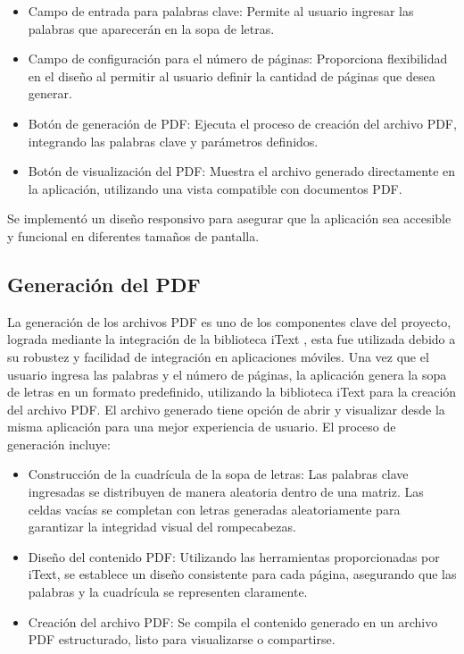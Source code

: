 \documentclass[conference]{IEEEtran}
\begin{document}
\begin{itemize}
    \item Campo de entrada para palabras clave: Permite al usuario ingresar las palabras que aparecerán en la sopa de letras.

    \item Campo de configuración para el número de páginas: Proporciona flexibilidad en el diseño al permitir al usuario definir la cantidad de páginas que desea generar.

    \item Botón de generación de PDF: Ejecuta el proceso de creación del archivo PDF, integrando las palabras clave y parámetros definidos.

    \item Botón de visualización del PDF: Muestra el archivo generado directamente en la aplicación, utilizando una vista compatible con documentos PDF.
\end{itemize}

Se implementó un diseño responsivo para asegurar que la aplicación sea accesible y funcional en diferentes tamaños de pantalla.

\subsection{Generación del PDF}
La generación de los archivos PDF es uno de los componentes clave del proyecto, lograda mediante la integración de la biblioteca iText \cite{itextpdf}, esta fue utilizada debido a su robustez y facilidad de integración en aplicaciones móviles. 
Una vez que el usuario ingresa las palabras y el número de páginas, la aplicación genera la sopa de letras en un formato predefinido, utilizando la biblioteca iText para la creación del archivo PDF. El archivo generado tiene opción de abrir y visualizar desde la misma aplicación para una mejor experiencia de usuario.
El proceso de generación incluye:
\begin{itemize}
    \item Construcción de la cuadrícula de la sopa de letras: Las palabras clave ingresadas se distribuyen de manera aleatoria dentro de una matriz. Las celdas vacías se completan con letras generadas aleatoriamente para garantizar la integridad visual del rompecabezas.

    \item Diseño del contenido PDF: Utilizando las herramientas proporcionadas por iText, se establece un diseño consistente para cada página, asegurando que las palabras y la cuadrícula se representen claramente.

    \item Creación del archivo PDF: Se compila el contenido generado en un archivo PDF estructurado, listo para visualizarse o compartirse.
\end{itemize}
\end{document}
